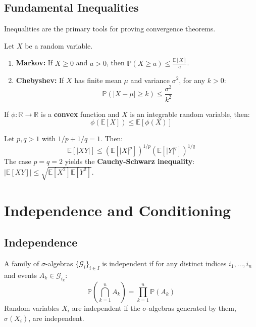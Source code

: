 \documentclass[oneside]{book}
\begin{document}
\subsection{Fundamental Inequalities}

Inequalities are the primary tools for proving convergence theorems.

\begin{theorem}
Let $X$ be a random variable.
\begin{enumerate}
    \item \textbf{Markov:} If $X \ge 0$ and $a > 0$, then $\mathbb{P}(X \ge a) \le \frac{\mathbb{E}[X]}{a}$.
    \item \textbf{Chebyshev:} If $X$ has finite mean $\mu$ and variance $\sigma^2$, for any $k > 0$:
    \[ \mathbb{P}(|X - \mu| \ge k) \le \frac{\sigma^2}{k^2} \]
\end{enumerate}
\end{theorem}

\begin{theorem}
If $\phi: \mathbb{R} \to \mathbb{R}$ is a \textbf{convex} function and $X$ is an integrable random variable, then:
\[ \phi(\mathbb{E}[X]) \le \mathbb{E}[\phi(X)] \]
\end{theorem}

\begin{theorem}
Let $p, q > 1$ with $1/p + 1/q = 1$. Then:
\[ \mathbb{E}[|XY|] \le (\mathbb{E}[|X|^p])^{1/p} (\mathbb{E}[|Y|^q])^{1/q} \]
The case $p=q=2$ yields the \textbf{Cauchy-Schwarz inequality}: $|\mathbb{E}[XY]| \le \sqrt{\mathbb{E}[X^2]\mathbb{E}[Y^2]}$.
\end{theorem}

\section{Independence and Conditioning}

\subsection{Independence}

\begin{definition}[Independence]
A family of $\sigma$-algebras $\{\mathcal{G}_i\}_{i \in I}$ is independent if for any distinct indices $i_1, \dots, i_n$ and events $A_k \in \mathcal{G}_{i_k}$:
\[ \mathbb{P}\left(\bigcap_{k=1}^n A_k\right) = \prod_{k=1}^n \mathbb{P}(A_k) \]
Random variables $X_i$ are independent if the $\sigma$-algebras generated by them, $\sigma(X_i)$, are independent.
\end{definition}
\end{document}
